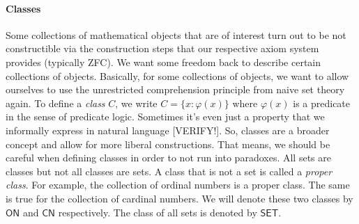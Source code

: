 



\paragraph{Classes}
Some collections of mathematical objects that are of interest turn out to be not constructible via the construction steps that our respective axiom system provides (typically ZFC). We want some freedom back to describe certain collections of objects. Basically, for some collections of objects, we want to allow ourselves to use the unrestricted comprehension principle from naive set theory again. To define a \emph{class} $C$, we write $C = \{x: \varphi(x)\}$ where $\varphi(x)$ is a predicate in the sense of predicate logic. Sometimes it's even just a property that we informally express in natural language [VERIFY!]. So, classes are a broader concept and allow for more liberal constructions. That means, we should be careful when defining classes in order to not run into paradoxes. All sets are classes but not all classes are sets. A class that is not a set is called a \emph{proper class}. For example, the collection of ordinal numbers is a proper class. The same is true for the collection of cardinal numbers. We will denote these two classes by $\mathsf{ON}$ and $\mathsf{CN}$ respectively. The class of all sets is denoted by $\mathsf{SET}$.






